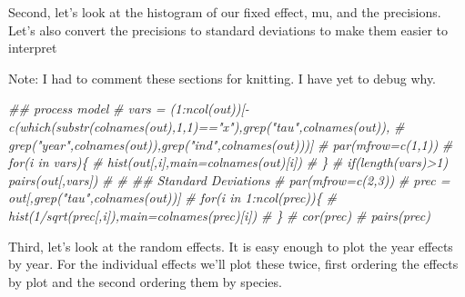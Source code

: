 \documentclass[]{article}
\newenvironment{Shaded}{\begin{snugshade}}{\end{snugshade}}
\newcommand{\CommentTok}[1]{\textcolor[rgb]{0.56,0.35,0.01}{\textit{#1}}}
\begin{document}
Second, let's look at the histogram of our fixed effect, mu, and the
precisions. Let's also convert the precisions to standard deviations to
make them easier to interpret

Note: I had to comment these sections for knitting. I have yet to debug
why.

\begin{Shaded}
\begin{Highlighting}[]
  \CommentTok{## process model}
  \CommentTok{# vars = (1:ncol(out))[-c(which(substr(colnames(out),1,1)=="x"),grep("tau",colnames(out)),}
  \CommentTok{#                         grep("year",colnames(out)),grep("ind",colnames(out)))]}
  \CommentTok{# par(mfrow=c(1,1))}
  \CommentTok{# for(i in vars)\{}
  \CommentTok{#   hist(out[,i],main=colnames(out)[i])}
  \CommentTok{# \}}
  \CommentTok{# if(length(vars)>1) pairs(out[,vars])}
  \CommentTok{# }
  \CommentTok{# ## Standard Deviations}
  \CommentTok{# par(mfrow=c(2,3))}
  \CommentTok{# prec = out[,grep("tau",colnames(out))]}
  \CommentTok{# for(i in 1:ncol(prec))\{}
  \CommentTok{#   hist(1/sqrt(prec[,i]),main=colnames(prec)[i])}
  \CommentTok{# \}}
  \CommentTok{# cor(prec)}
  \CommentTok{# pairs(prec)}
\end{Highlighting}
\end{Shaded}

Third, let's look at the random effects. It is easy enough to plot the
year effects by year. For the individual effects we'll plot these twice,
first ordering the effects by plot and the second ordering them by
species.
\end{document}
